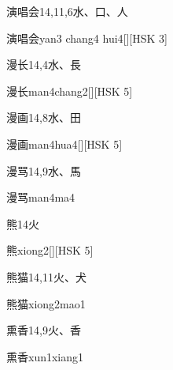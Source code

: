 \begin{entry}{演唱会}{14,11,6}{⽔、⼝、⼈}
  \begin{phonetics}{演唱会}{yan3 chang4 hui4}[][HSK 3]
  \end{phonetics}
\end{entry}

\begin{entry}{漫长}{14,4}{⽔、⾧}
  \begin{phonetics}{漫长}{man4chang2}[][HSK 5]
  \end{phonetics}
\end{entry}

\begin{entry}{漫画}{14,8}{⽔、⽥}
  \begin{phonetics}{漫画}{man4hua4}[][HSK 5]
  \end{phonetics}
\end{entry}

\begin{entry}{漫骂}{14,9}{⽔、⾺}
  \begin{phonetics}{漫骂}{man4ma4}
  \end{phonetics}
\end{entry}

\begin{entry}{熊}{14}{⽕}
  \begin{phonetics}{熊}{xiong2}[][HSK 5]
  \end{phonetics}
\end{entry}

\begin{entry}{熊猫}{14,11}{⽕、⽝}
  \begin{phonetics}{熊猫}{xiong2mao1}
  \end{phonetics}
\end{entry}

\begin{entry}{熏香}{14,9}{⽕、⾹}
  \begin{phonetics}{熏香}{xun1xiang1}
  \end{phonetics}
\end{entry}

